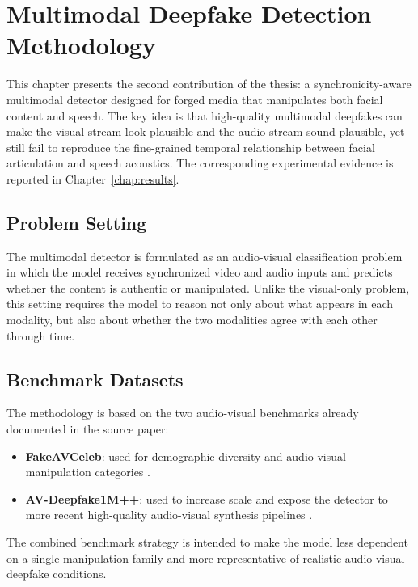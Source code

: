 \chapter{Multimodal Deepfake Detection Methodology}
\label{chap:multimodal-method}

This chapter presents the second contribution of the thesis: a synchronicity-aware multimodal detector designed for forged media that manipulates both facial content and speech. The key idea is that high-quality multimodal deepfakes can make the visual stream look plausible and the audio stream sound plausible, yet still fail to reproduce the fine-grained temporal relationship between facial articulation and speech acoustics. The corresponding experimental evidence is reported in Chapter~\ref{chap:results}.

\section{Problem Setting}

The multimodal detector is formulated as an audio-visual classification problem in which the model receives synchronized video and audio inputs and predicts whether the content is authentic or manipulated. Unlike the visual-only problem, this setting requires the model to reason not only about what appears in each modality, but also about whether the two modalities agree with each other through time.

\section{Benchmark Datasets}

The methodology is based on the two audio-visual benchmarks already documented in the source paper:
\begin{itemize}
    \item \textbf{FakeAVCeleb}: used for demographic diversity and audio-visual manipulation categories \cite{Khalid2022}.
    \item \textbf{AV-Deepfake1M++}: used to increase scale and expose the detector to more recent high-quality audio-visual synthesis pipelines \cite{Jung2024}.
\end{itemize}

The combined benchmark strategy is intended to make the model less dependent on a single manipulation family and more representative of realistic audio-visual deepfake conditions.

